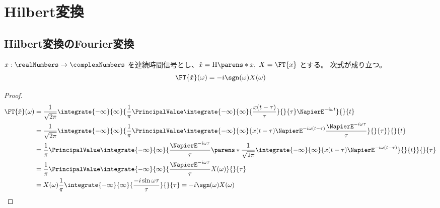 \part{Hilbert変換}
    \newcommand{\HilbertTransform}[1]{\mathrm{H}\parens*{#1}}
    \chapter{Hilbert変換のFourier変換}
        \begin{shadebox}
            $x:\realNumbers\to\complexNumbers$ を連続時間信号とし、$\hat{x} = \HilbertTransform{x},\;X = \FT{x}$ とする。
            次式が成り立つ。
            \[ \FT{\hat{x}}(\omega) = -i\sgn(\omega)X(\omega) \]
        \end{shadebox}
        \begin{proof}
            \begin{align*}
                \FT{\hat{x}}(\omega) &= \frac{1}{\sqrt{2\pi}}\integrate{-\infty}{\infty}{\frac{1}{\pi}\PrincipalValue\integrate{-\infty}{\infty}{\frac{x(t-\tau)}{\tau}}{}{\tau}\NapierE^{-i\omega t}}{}{t} \\
                &= \frac{1}{\sqrt{2\pi}}\integrate{-\infty}{\infty}{\frac{1}{\pi}\PrincipalValue\integrate{-\infty}{\infty}{x(t-\tau)\NapierE^{-i\omega(t-\tau)}\frac{\NapierE^{-i\omega \tau}}{\tau}}{}{\tau}}{}{t} \\
                &= \frac{1}{\pi}\PrincipalValue\integrate{-\infty}{\infty}{\frac{\NapierE^{-i\omega \tau}}{\tau}\parens*{\frac{1}{\sqrt{2\pi}}\integrate{-\infty}{\infty}{x(t-\tau)\NapierE^{-i\omega(t-\tau)}}{}{t}}}{}{\tau} \\
                &= \frac{1}{\pi}\PrincipalValue\integrate{-\infty}{\infty}{\frac{\NapierE^{-i\omega \tau}}{\tau}X(\omega)}{}{\tau} \\
                &= X(\omega)\frac{1}{\pi}\integrate{-\infty}{\infty}{\frac{-i\sin\omega\tau}{\tau}}{}{\tau} = -i\sgn(\omega)X(\omega)
            \end{align*}
        \end{proof}